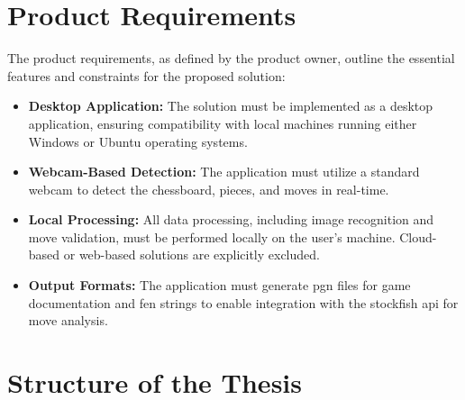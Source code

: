 
\section{Product Requirements}

The product requirements, as defined by the product owner, outline the essential features and constraints for the proposed solution:

\begin{itemize}
    \item \textbf{Desktop Application:} The solution must be implemented as a desktop application, ensuring compatibility with local machines running either Windows or Ubuntu operating systems.

    \item \textbf{Webcam-Based Detection:} The application must utilize a standard webcam to detect the chessboard, pieces, and moves in real-time.

    \item \textbf{Local Processing:} All data processing, including image recognition and move validation, must be performed locally on the user's machine. Cloud-based or web-based solutions are explicitly excluded.

    \item \textbf{Output Formats:} The application must generate \gls{pgn} files for game documentation and \gls{fen} strings to enable integration with the \gls{stockfish} \gls{api} for move analysis.
\end{itemize}

\section{Structure of the Thesis}

